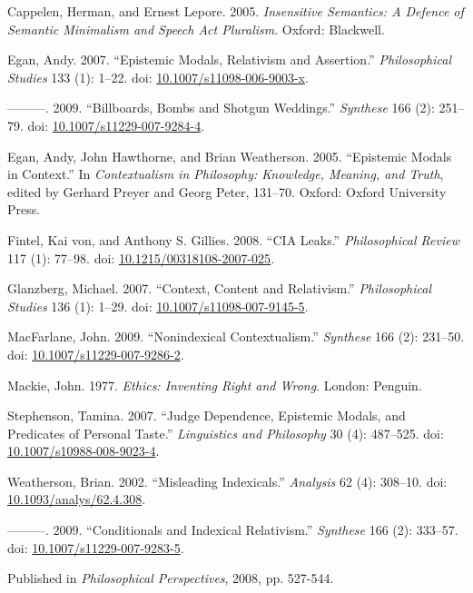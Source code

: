 \documentclass[
  11pt,
  letterpaper,
  DIV=11,
  numbers=noendperiod,
  twoside]{scrartcl}
\newlength{\cslhangindent}
\newenvironment{CSLReferences}[2] %
 {\begin{list}{}{%
  \setlength{\itemindent}{0pt}
  \setlength{\leftmargin}{0pt}
  \setlength{\parsep}{0pt}
  \ifodd #1
   \setlength{\leftmargin}{\cslhangindent}
   \setlength{\itemindent}{-1\cslhangindent}
  \fi
  \setlength{\itemsep}{#2\baselineskip}}}
 {\end{list}}
\begin{document}
\label{refs}
\begin{CSLReferences}{1}{0}
Cappelen, Herman, and Ernest Lepore. 2005. \emph{Insensitive Semantics:
A Defence of Semantic Minimalism and Speech Act Pluralism}. Oxford:
Blackwell.

Egan, Andy. 2007. {``{Epistemic Modals, Relativism and Assertion}.''}
\emph{Philosophical Studies} 133 (1): 1--22. doi:
\href{https://doi.org/10.1007/s11098-006-9003-x}{10.1007/s11098-006-9003-x}.

---------. 2009. {``{Billboards, Bombs and Shotgun Weddings}.''}
\emph{Synthese} 166 (2): 251--79. doi:
\href{https://doi.org/10.1007/s11229-007-9284-4}{10.1007/s11229-007-9284-4}.

Egan, Andy, John Hawthorne, and Brian Weatherson. 2005. {``{Epistemic
Modals in Context}.''} In \emph{Contextualism in Philosophy: Knowledge,
Meaning, and Truth}, edited by Gerhard Preyer and Georg Peter, 131--70.
Oxford: Oxford University Press.

Fintel, Kai von, and Anthony S. Gillies. 2008. {``CIA Leaks.''}
\emph{Philosophical Review} 117 (1): 77--98. doi:
\href{https://doi.org/10.1215/00318108-2007-025}{10.1215/00318108-2007-025}.

Glanzberg, Michael. 2007. {``Context, Content and Relativism.''}
\emph{Philosophical Studies} 136 (1): 1--29. doi:
\href{https://doi.org/10.1007/s11098-007-9145-5}{10.1007/s11098-007-9145-5}.

MacFarlane, John. 2009. {``{Nonindexical Contextualism}.''}
\emph{Synthese} 166 (2): 231--50. doi:
\href{https://doi.org/10.1007/s11229-007-9286-2}{10.1007/s11229-007-9286-2}.

Mackie, John. 1977. \emph{Ethics: Inventing Right and Wrong}. London:
Penguin.

Stephenson, Tamina. 2007. {``Judge Dependence, Epistemic Modals, and
Predicates of Personal Taste.''} \emph{Linguistics and Philosophy} 30
(4): 487--525. doi:
\href{https://doi.org/10.1007/s10988-008-9023-4}{10.1007/s10988-008-9023-4}.

Weatherson, Brian. 2002. {``Misleading Indexicals.''} \emph{Analysis} 62
(4): 308--10. doi:
\href{https://doi.org/10.1093/analys/62.4.308}{10.1093/analys/62.4.308}.

---------. 2009. {``{Conditionals and Indexical Relativism}.''}
\emph{Synthese} 166 (2): 333--57. doi:
\href{https://doi.org/10.1007/s11229-007-9283-5}{10.1007/s11229-007-9283-5}.

\end{CSLReferences}



\noindent Published in\emph{
Philosophical Perspectives}, 2008, pp. 527-544.
\end{document}
